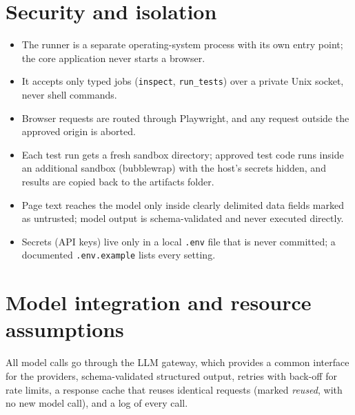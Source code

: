 \documentclass[11pt,a4paper]{article}
\newcommand{\code}[1]{\texttt{#1}}
\begin{document}
\section{Security and isolation}
\label{sec:security}
\begin{itemize}
  \item The runner is a separate operating-system process with its own entry point; the core application never starts a browser.
  \item It accepts only typed jobs (\code{inspect}, \code{run\_tests}) over a private Unix socket, never shell commands.
  \item Browser requests are routed through Playwright, and any request outside the approved origin is aborted.
  \item Each test run gets a fresh sandbox directory; approved test code runs inside an additional sandbox (bubblewrap) with the host's secrets hidden, and results are copied back to the artifacts folder.
  \item Page text reaches the model only inside clearly delimited data fields marked as untrusted; model output is schema-validated and never executed directly.
  \item Secrets (API keys) live only in a local \code{.env} file that is never committed; a documented \code{.env.example} lists every setting.
\end{itemize}

\section{Model integration and resource assumptions}
\label{sec:resources}
All model calls go through the LLM gateway, which provides a common interface for the providers, schema-validated structured output, retries with back-off for rate limits, a response cache that reuses identical requests (marked \emph{reused}, with no new model call), and a log of every call.
\end{document}
